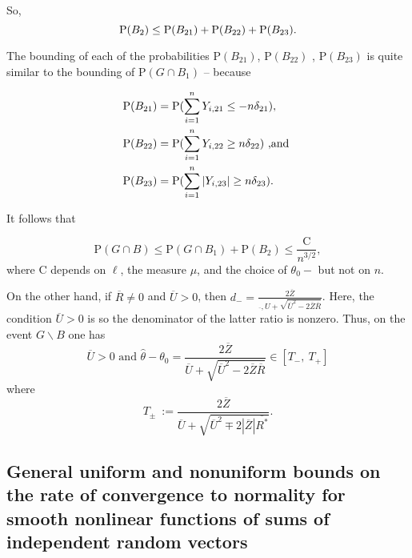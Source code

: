 So,
\begin{equation}
	\mathrm{P}(B_{2})\leq \mathrm{P}(B_{21})+\mathrm{P}(B_{22})+\mathrm{P}(B_{23}).
\end{equation}

The bounding of each of the probabilities $\mathrm{P}(B_{21})$, $\mathrm{P}(B_{22})$ , $\mathrm{P}(B_{23})$ is quite similar to the bounding of $\mathrm{P}(G\cap B_{1})$ -- because 

\begin{align*}
	\mathrm{P}(B_{21})&=\mathrm{P}(\sum_{i=1}^{n}Y_{i,21}\leq-n\delta_{21}), \\
	\mathrm{P}(B_{22})&=\mathrm{P}(\sum_{i=1}^{n}Y_{i,22}\geq n\delta_{22}) \textrm{ ,and } \\ 
	\mathrm{P}(B_{23})&= \mathrm{P}(\sum_{i=1}^{n}|Y_{i,23}|\geq n\delta_{23}).
\end{align*} 

It follows that 

\begin{equation}\label{GandB}
	\mathrm{P}(G\cap B)\leq \mathrm{P}(G\cap B_{1})+\mathrm{P}(B_{2})\leq\frac{\mathrm{C}}{n^{3/2}}, 
\end{equation}
where $\mathrm{C}$ depends on $\ell$, the measure $\mu$, and the choice of $\theta_{0}-$ but not on $n.$


On the other hand, if $\overline{R}\neq 0$ and $\overline{U}>0$, then $d_{-}=\displaystyle \frac{2\overline{Z}}{\overline{},U+\sqrt{\overline{U}^{2}-2\overline{Z}\overline{R}}}$. Here, the condition $\overline{U}>0$ is so the denominator of the latter ratio is nonzero. Thus, on the event $G\backslash B$ one has
\begin{equation}\label{inclusionrelation}
	\overline{U}>0 \textrm{ and } \displaystyle \hat{\theta}-\theta_{0}=\frac{2\overline{Z}}{\overline{U}+\sqrt{\overline{U}^{2}-2\overline{Z}\overline{R}}}\in[T_{-},\ T_{+}]
\end{equation}
where
\begin{equation}\label{Tpm}
	T_{\pm}\ :=\frac{2\overline{Z}}{\overline{U}+\sqrt{\overline{U}^{2}\mp 2|\overline{Z}|\overline{R^{*}}}
	}.
\end{equation}

\medskip

\subsection*{General uniform and nonuniform bounds on the rate of convergence to normality for smooth nonlinear functions of sums of independent random vectors}

